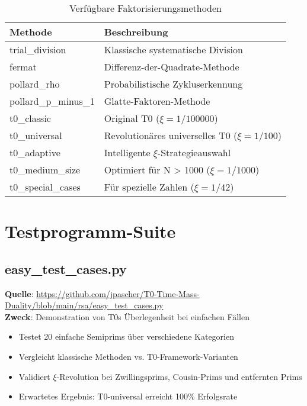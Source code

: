 \documentclass[12pt,a4paper]{article}
\begin{document}
	\begin{table}[H]
		\centering
		\caption{Verfügbare Faktorisierungsmethoden}
		\begin{tabular}{ll}
			\toprule
			\textbf{Methode} & \textbf{Beschreibung} \\
			\midrule
			trial\_division & Klassische systematische Division \\
			fermat & Differenz-der-Quadrate-Methode \\
			pollard\_rho & Probabilistische Zykluserkennung \\
			pollard\_p\_minus\_1 & Glatte-Faktoren-Methode \\
			t0\_classic & Original T0 ($\xi = 1/100000$) \\
			t0\_universal & Revolutionäres universelles T0 ($\xi = 1/100$) \\
			t0\_adaptive & Intelligente $\xi$-Strategieauswahl \\
			t0\_medium\_size & Optimiert für N > 1000 ($\xi = 1/1000$) \\
			t0\_special\_cases & Für spezielle Zahlen ($\xi = 1/42$) \\
			\bottomrule
		\end{tabular}
	\end{table}
	
	\section{Testprogramm-Suite}
	
	\subsection{easy\_test\_cases.py}
	\textbf{Quelle}: \url{https://github.com/jpascher/T0-Time-Mass-Duality/blob/main/rsa/easy_test_cases.py}\\
	\textbf{Zweck}: Demonstration von T0s Überlegenheit bei einfachen Fällen
	\begin{itemize}
		\item Testet 20 einfache Semiprims über verschiedene Kategorien
		\item Vergleicht klassische Methoden vs. T0-Framework-Varianten
		\item Validiert $\xi$-Revolution bei Zwillingsprims, Cousin-Prims und entfernten Prims
		\item Erwartetes Ergebnis: T0-universal erreicht 100\% Erfolgsrate
	\end{itemize}
	
\end{document}

